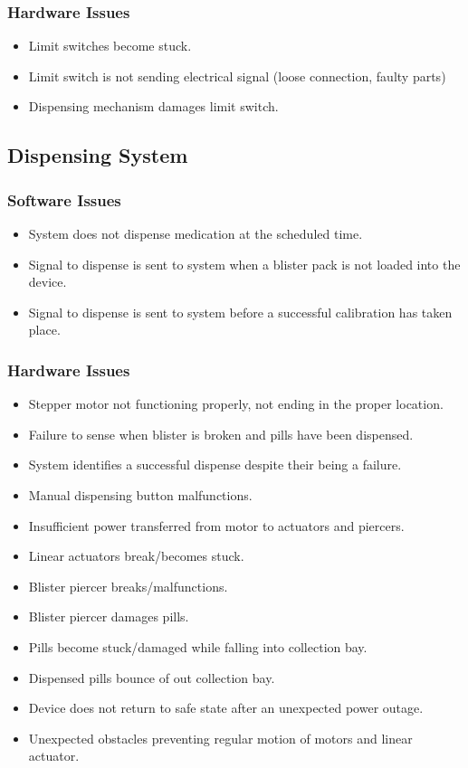 \documentclass[12pt,titlepage]{article}
\begin{document}
\subsubsection*{Hardware Issues}
\begin{itemize}
\item Limit switches become stuck.
\item Limit switch is not sending electrical signal (loose connection, faulty parts)
\item Dispensing mechanism damages limit switch.
\end{itemize}

\subsection{Dispensing System}
\subsubsection*{Software Issues}
\begin{itemize}
\item System does not dispense medication at the scheduled time.
\item Signal to dispense is sent to system when a blister pack is not loaded into the device.
\item Signal to dispense is sent to system before a successful calibration has taken place.
\end{itemize}
\subsubsection*{Hardware Issues}
\begin{itemize}
\item Stepper motor not functioning properly, not ending in the proper location.
\item Failure to sense when blister is broken and pills have been dispensed.
\item System identifies a successful dispense despite their being a failure.
\item Manual dispensing button malfunctions.
\item Insufficient power transferred from motor to actuators and piercers.
\item Linear actuators break/becomes stuck. 
\item Blister piercer breaks/malfunctions.
\item Blister piercer damages pills.
\item Pills become stuck/damaged while falling into collection bay.
\item Dispensed pills bounce of out collection bay.
\item Device does not return to safe state after an unexpected power outage.
\item Unexpected obstacles preventing regular motion of motors and linear actuator.
\end{itemize}
\end{document}
